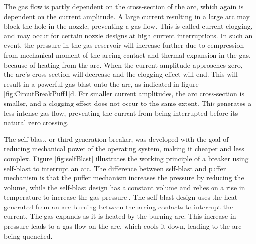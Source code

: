 \documentclass[10pt,b5paper,twoside]{article}
\begin{document}
The gas flow is partly dependent on the cross-section of the arc, which again is dependent on the current amplitude. A large current resulting in a large arc may block the hole in the nozzle, preventing a gas flow. This is called current clogging, and may occur for certain nozzle designs at high current interruptions. In such an event, the pressure in the gas reservoir will increase further due to compression from mechanical moment of the arcing contact and thermal expansion in the gas, because of heating from the arc. When the current amplitude approaches zero, the arc's cross-section will decrease and the clogging effect will end. This will result in a powerful gas blast onto the arc, as indicated in figure \ref{fig:CircutBreakPuff1}d. For smaller current amplitudes, the arc cross-section is smaller, and a clogging effect does not occur to the same extent. This generates a less intense gas flow, preventing the current from being interrupted before its natural zero crossing.

The self-blast, or third generation breaker, was developed with the goal of reducing mechanical power of the operating system, making it cheaper and less complex. Figure \ref{fig:selfBlast} illustrates the working principle of a breaker using self-blast to interrupt an arc. The difference between self-blast and puffer mechanism is that the puffer mechanism increases the pressure by reducing the volume, while the self-blast design has a constant volume and relies on a rise in temperature to increase the gas pressure \cite{bib:CBAC}. The self-blast design uses the heat generated from an arc burning between the arcing contacts to interrupt the current. The gas expands as it is heated by the burning arc. This increase in pressure leads to a gas flow on the arc, which cools it down, leading to the arc being quenched.
\end{document}
